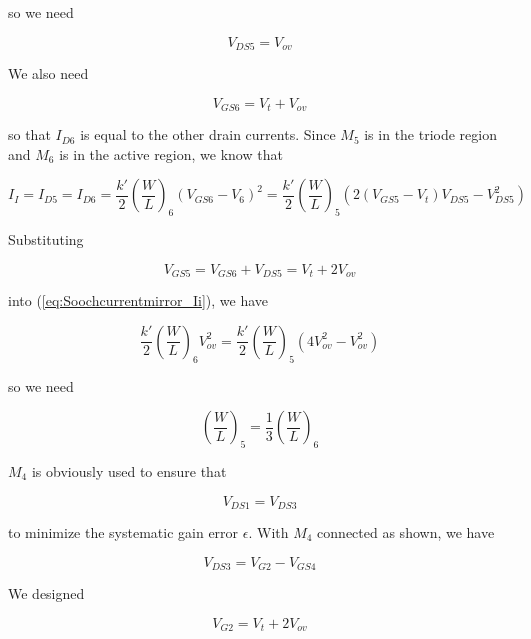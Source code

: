 so we need

\begin{equation}
V_{DS5} = V_{ov}
\end{equation}

We also need

\begin{equation}
V_{GS6} = V_{t} + V_{ov}
\end{equation}

so that $I_{D6}$ is equal to the other drain currents.
Since $M_{5}$ is in the triode region and $M_6$ is in the active region, we know that

\begin{equation}
I_{I} = I_{D5} = I_{D6} = \frac{k'}{2}\left(\frac{W}{L}\right)_{6}(V_{GS6}-V_{6})^{2} = \frac{k'}{2}\left(\frac{W}{L}\right)_{5}(2(V_{GS5}-V_{t})V_{DS5} - V_{DS5}^{2})
\label{eq:Soochcurrentmirror_Ii}
\end{equation}

Substituting

\begin{equation}
V_{GS5} = V_{GS6} + V_{DS5} = V_{t} + 2V_{ov}
\end{equation}

into (\ref{eq:Soochcurrentmirror_Ii}), we have

\begin{equation}
\frac{k'}{2}\left(\frac{W}{L}\right)_{6}V_{ov}^{2} = \frac{k'}{2}\left(\frac{W}{L}\right)_{5}(4V_{ov}^{2}-V_{ov}^{2})
\end{equation}

so we need

\begin{equation}
(\frac{W}{L})_{5} = \frac{1}{3}(\frac{W}{L})_{6}
\end{equation}

$M_4$ is obviously used to ensure that

\begin{equation}
V_{DS1} = V_{DS3}
\end{equation}

to minimize the systematic gain error $\epsilon$.
With $M_4$ connected as shown, we have

\begin{equation}
V_{DS3} = V_{G2} - V_{GS4}
\end{equation}

We designed

\begin{equation}
V_{G2} = V_{t} + 2V_{ov}
\end{equation}

